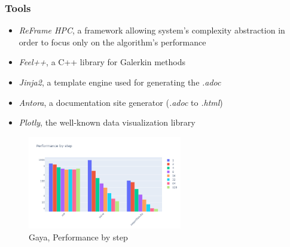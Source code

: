 \documentclass[10pt]{beamer}
\begin{document}
\begin{frame}
    \frametitle{\textbf{Tools}}
    \begin{itemize}
        \addtolength{\itemsep}{7pt}
        \item \textit{ReFrame HPC}, a framework allowing system's complexity abstraction in order to focus only on the algorithm's performance
        \item \textit{Feel++}, a C++ library for Galerkin methods
        \item \textit{Jinja2}, a template engine used for generating the \textit{.adoc}
        \item \textit{Antora}, a documentation site generator \small{(\textit{.adoc} to \textit{.html})}
        \item \textit{Plotly}, the well-known data visualization library
    \end{itemize}

    \begin{figure}
        \centering
        \includegraphics[width=0.6\textwidth]{../illustrations/gaya-graphs/gayaByStep.png}
        \caption{Gaya, Performance by step}
    \end{figure}
\end{frame}
\end{document}
